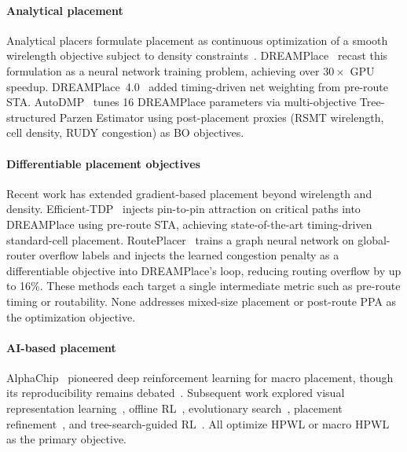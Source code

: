 \documentclass[sigconf,anonymous,review,9pt]{acmart}
\begin{document}
\paragraph{Analytical placement}
Analytical placers formulate placement as continuous optimization of a
smooth wirelength objective subject to density
constraints~\cite{lu2015eplace, cheng2019replace}.
DREAMPlace~\cite{lin2019dreamplace} recast this formulation as a
neural network training problem, achieving over $30\times$ GPU
speedup. DREAMPlace~4.0~\cite{dreamplace4} added timing-driven net
weighting from pre-route STA. AutoDMP~\cite{autodmp2023} tunes 16
DREAMPlace parameters via multi-objective Tree-structured Parzen
Estimator using post-placement proxies (RSMT wirelength, cell
density, RUDY congestion) as BO objectives.

\paragraph{Differentiable placement objectives}
Recent work has extended gradient-based placement beyond wirelength
and density. Efficient-TDP~\cite{efficienttdp2025}
injects pin-to-pin attraction on critical paths into DREAMPlace using
pre-route STA, achieving state-of-the-art timing-driven standard-cell
placement. RoutePlacer~\cite{routeplacer2024} trains a graph neural
network on global-router overflow labels and injects the learned
congestion penalty as a differentiable objective into DREAMPlace's
loop, reducing routing overflow by up to 16\%.
These methods each target a single intermediate metric such as
pre-route timing or routability. None addresses mixed-size placement
or post-route PPA as the optimization objective.

\paragraph{AI-based placement}
AlphaChip~\cite{mirhoseini2021graph} pioneered deep reinforcement
learning for macro placement, though its reproducibility remains
debated~\cite{kahng2023reevaluating}. Subsequent work explored visual
representation learning~\cite{lai2022maskplace}, offline
RL~\cite{lai2023chipformer}, evolutionary
search~\cite{shi2023wire}, placement
refinement~\cite{maskregulate2024}, and tree-search-guided
RL~\cite{efficientplace2024}. All optimize HPWL or macro HPWL as the
primary objective.
\end{document}
